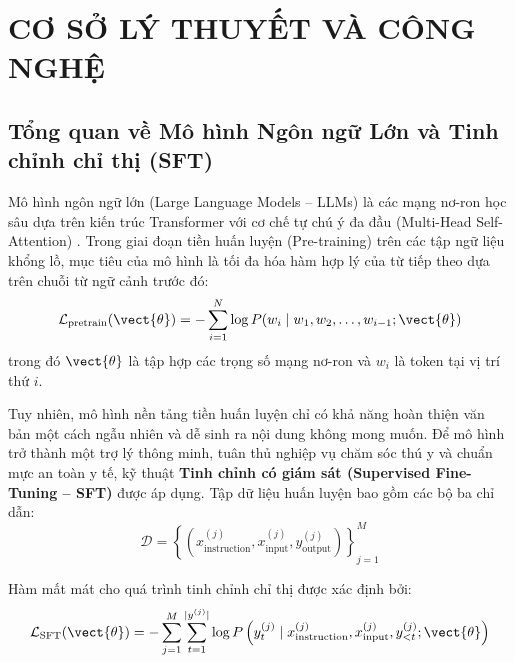 
\chapter{CƠ SỞ LÝ THUYẾT VÀ CÔNG NGHỆ}
\label{chap:cossolythuyet}

\section{Tổng quan về Mô hình Ngôn ngữ Lớn và Tinh chỉnh chỉ thị (SFT)}
\label{sec:kientruc_ai}

Mô hình ngôn ngữ lớn (Large Language Models -- LLMs) là các mạng nơ-ron học sâu dựa trên kiến trúc Transformer với cơ chế tự chú ý đa đầu (Multi-Head Self-Attention) \cite{vaswani2017attention}. Trong giai đoạn tiền huấn luyện (Pre-training) trên các tập ngữ liệu khổng lồ, mục tiêu của mô hình là tối đa hóa hàm hợp lý của từ tiếp theo dựa trên chuỗi từ ngữ cảnh trước đó:
\begin{equation}
    \mathcal{L}_{\text{pretrain}}(\vect{\theta}) = -\sum_{i=1}^{N} \log P(w_i \mid w_1, w_2, \dots, w_{i-1}; \vect{\theta})
    \label{eq:pretrain_loss}
\end{equation}
trong đó $\vect{\theta}$ là tập hợp các trọng số mạng nơ-ron và $w_i$ là token tại vị trí thứ $i$.

Tuy nhiên, mô hình nền tảng tiền huấn luyện chỉ có khả năng hoàn thiện văn bản một cách ngẫu nhiên và dễ sinh ra nội dung không mong muốn. Để mô hình trở thành một trợ lý thông minh, tuân thủ nghiệp vụ chăm sóc thú y và chuẩn mực an toàn y tế, kỹ thuật \textbf{Tinh chỉnh có giám sát (Supervised Fine-Tuning -- SFT)} được áp dụng. Tập dữ liệu huấn luyện bao gồm các bộ ba chỉ dẫn:
\begin{equation}
    \mathcal{D} = \left\{ \left(x_{\text{instruction}}^{(j)}, x_{\text{input}}^{(j)}, y_{\text{output}}^{(j)}\right) \right\}_{j=1}^{M}
    \label{eq:sft_dataset}
\end{equation}

Hàm mất mát cho quá trình tinh chỉnh chỉ thị được xác định bởi:
\begin{equation}
    \mathcal{L}_{\text{SFT}}(\vect{\theta}) = -\sum_{j=1}^{M} \sum_{t=1}^{|y^{(j)}|} \log P\left(y_t^{(j)} \mid x_{\text{instruction}}^{(j)}, x_{\text{input}}^{(j)}, y_{<t}^{(j)}; \vect{\theta}\right)
    \label{eq:sft_loss}
\end{equation}

